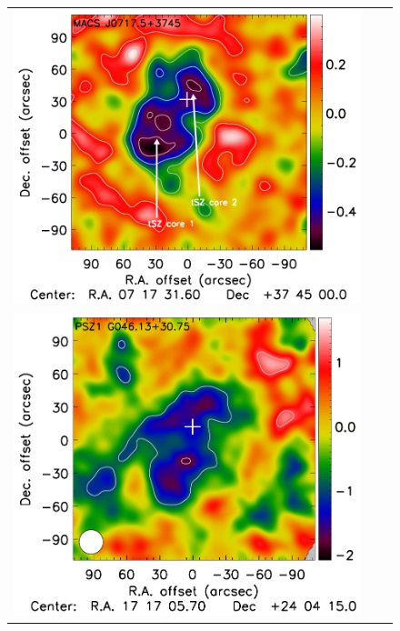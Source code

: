 \documentclass[twocolumn,traditabstract]{aa}
\begin{document}
\begin{figure}[p]
{\begin{tabular}{lll}
\includegraphics[trim=2.3cm 2.2cm 0cm 0cm, clip=true, scale=1]{Figure/DoG_MACSJ0717_15_15_45.pdf} \\
\includegraphics[trim=0cm 2.2cm 0cm 0cm, clip=true, scale=1]{Figure/Map_PSZ1G046.pdf} & 

\end{tabular}}
\end{figure}
\end{document}
